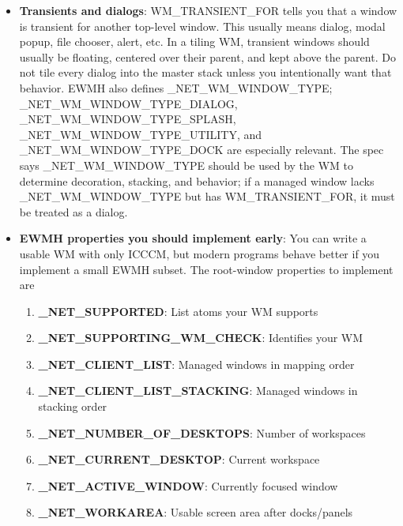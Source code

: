 \documentclass{report}
\begin{document}
\begin{itemize}
            \bigbreak \noindent 
            But ICCCM expects the client to be told what its actual geometry is. If the WM denies a configure request, it should send a synthetic ConfigureNotify describing the unchanged geometry. If it changes the geometry, it may also need to send a synthetic ConfigureNotify, especially for reparenting WMs.
        \item \textbf{Transients and dialogs}: WM\_TRANSIENT\_FOR tells you that a window is transient for another top-level window. This usually means dialog, modal popup, file chooser, alert, etc.
            \bigbreak \noindent 
            In a tiling WM, transient windows should usually be floating, centered over their parent, and kept above the parent. Do not tile every dialog into the master stack unless you intentionally want that behavior.
            \bigbreak \noindent 
            EWMH also defines \_NET\_WM\_WINDOW\_TYPE; \_NET\_WM\_WINDOW\_TYPE\_DIALOG, \_NET\_WM\_WINDOW\_TYPE\_SPLASH, \_NET\_WM\_WINDOW\_TYPE\_UTILITY, and \_NET\_WM\_WINDOW\_TYPE\_DOCK are especially relevant. The spec says \_NET\_WM\_WINDOW\_TYPE should be used by the WM to determine decoration, stacking, and behavior; if a managed window lacks \_NET\_WM\_WINDOW\_TYPE but has WM\_TRANSIENT\_FOR, it must be treated as a dialog.
        \item \textbf{EWMH properties you should implement early}: You can write a usable WM with only ICCCM, but modern programs behave better if you implement a small EWMH subset.
            \bigbreak \noindent 
            The root-window properties to implement are
            \begin{enumerate}
                \item \textbf{\_NET\_SUPPORTED}:	List atoms your WM supports
                \item \textbf{\_NET\_SUPPORTING\_WM\_CHECK}:	Identifies your WM
                \item \textbf{\_NET\_CLIENT\_LIST}:	Managed windows in mapping order
                \item \textbf{\_NET\_CLIENT\_LIST\_STACKING}:	Managed windows in stacking order
                \item \textbf{\_NET\_NUMBER\_OF\_DESKTOPS}:	Number of workspaces
                \item \textbf{\_NET\_CURRENT\_DESKTOP}:	Current workspace
                \item \textbf{\_NET\_ACTIVE\_WINDOW}:	Currently focused window
                \item \textbf{\_NET\_WORKAREA}:	Usable screen area after docks/panels

\end{enumerate}
\end{itemize}
\end{document}
